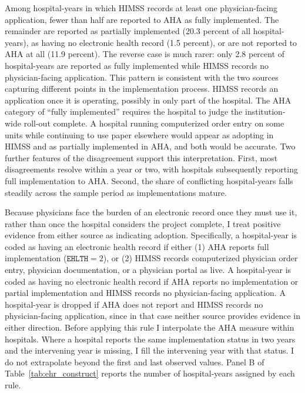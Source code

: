 \documentclass[12pt]{article}
\begin{document}


Among hospital-years in which HIMSS records at least one physician-facing application, fewer than half are reported to AHA as fully implemented. The remainder are reported as partially implemented (20.3 percent of all hospital-years), as having no electronic health record (1.5 percent), or are not reported to AHA at all (11.9 percent). The reverse case is much rarer: only 2.8 percent of hospital-years are reported as fully implemented while HIMSS records no physician-facing application. This pattern is consistent with the two sources capturing different points in the implementation process. HIMSS records an application once it is operating, possibly in only part of the hospital. The AHA category of ``fully implemented'' requires the hospital to judge the institution-wide roll-out complete. A hospital running computerized order entry on some units while continuing to use paper elsewhere would appear as adopting in HIMSS and as partially implemented in AHA, and both would be accurate. Two further features of the disagreement support this interpretation. First, most disagreements resolve within a year or two, with hospitals subsequently reporting full implementation to AHA. Second, the share of conflicting hospital-years falls steadily across the sample period as implementations mature.

Because physicians face the burden of an electronic record once they must use it, rather than once the hospital considers the project complete, I treat positive evidence from either source as indicating adoption. Specifically, a hospital-year is coded as having an electronic health record if either (1) AHA reports full implementation ($\texttt{EHLTH} = 2$), or (2) HIMSS records computerized physician order entry, physician documentation, or a physician portal as live. A hospital-year is coded as having no electronic health record if AHA reports no implementation or partial implementation and HIMSS records no physician-facing application. A hospital-year is dropped if AHA does not report and HIMSS records no physician-facing application, since in that case neither source provides evidence in either direction. Before applying this rule I interpolate the AHA measure within hospitals. Where a
hospital reports the same implementation status in two years and the intervening year is missing, I fill the intervening year with that status. I do not extrapolate beyond the first and last observed values. Panel B of Table~\ref{tab:ehr_construct} reports the number of hospital-years assigned by each rule.
\end{document}
